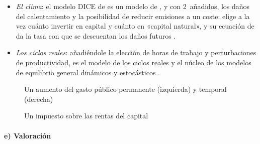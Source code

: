 \documentclass[11pt]{article}
\begin{document}
\begin{itemize}
\begin{itemize}
\begin{itemize}
    \item por eso, en este modelo, el impuesto óptimo sobre las rentas del capital a largo plazo es nulo: es el resultado de \textcite{Chamley1986Optimal} y \textcite{Judd1985Redistributive}  .
    \end{itemize}
  \end{itemize}
\item \emph{El clima}: el modelo DICE de  es un modelo de ,  y  con 2~añadidos, los daños del calentamiento y la posibilidad de reducir emisiones a un coste: elige a la vez cuánto invertir en capital y cuánto en «capital natural», y su ecuación de  da la tasa con que se descuentan los daños futuros  .
\item \emph{Los ciclos reales}: añadiéndole la elección de horas de trabajo y perturbaciones de productividad, es el modelo de los ciclos reales\nocite{KydlandPrescott1982Time,KingPlosserRebelo1988Production} y el núcleo de los modelos de equilibrio general dinámicos y estocásticos .
\end{itemize}

\begin{figure}[H]
\centering
\caption{Un aumento del gasto público permanente (izquierda) y temporal (derecha)}\label{fig:rck-fiscal}
\end{figure}

\begin{figure}[H]
\centering
\caption{Un impuesto sobre las rentas del capital}\label{fig:rck-impuesto}
\end{figure}

\paragraph{e) Valoración}
\end{document}

